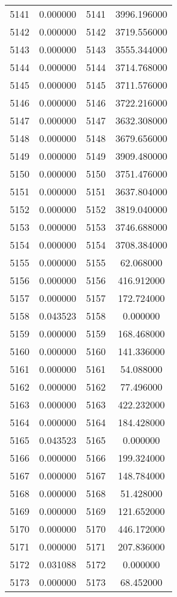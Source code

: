 \documentclass[12pt]{article}
\begin{document}
\begin{longtable}{@{}cccc@{}}
5141 & 0.000000 & 5141 & 3996.196000 \\
5142 & 0.000000 & 5142 & 3719.556000 \\
5143 & 0.000000 & 5143 & 3555.344000 \\
5144 & 0.000000 & 5144 & 3714.768000 \\
5145 & 0.000000 & 5145 & 3711.576000 \\
5146 & 0.000000 & 5146 & 3722.216000 \\
5147 & 0.000000 & 5147 & 3632.308000 \\
5148 & 0.000000 & 5148 & 3679.656000 \\
5149 & 0.000000 & 5149 & 3909.480000 \\
5150 & 0.000000 & 5150 & 3751.476000 \\
5151 & 0.000000 & 5151 & 3637.804000 \\
5152 & 0.000000 & 5152 & 3819.040000 \\
5153 & 0.000000 & 5153 & 3746.688000 \\
5154 & 0.000000 & 5154 & 3708.384000 \\
5155 & 0.000000 & 5155 & 62.068000 \\
5156 & 0.000000 & 5156 & 416.912000 \\
5157 & 0.000000 & 5157 & 172.724000 \\
5158 & 0.043523 & 5158 & 0.000000 \\
5159 & 0.000000 & 5159 & 168.468000 \\
5160 & 0.000000 & 5160 & 141.336000 \\
5161 & 0.000000 & 5161 & 54.088000 \\
5162 & 0.000000 & 5162 & 77.496000 \\
5163 & 0.000000 & 5163 & 422.232000 \\
5164 & 0.000000 & 5164 & 184.428000 \\
5165 & 0.043523 & 5165 & 0.000000 \\
5166 & 0.000000 & 5166 & 199.324000 \\
5167 & 0.000000 & 5167 & 148.784000 \\
5168 & 0.000000 & 5168 & 51.428000 \\
5169 & 0.000000 & 5169 & 121.652000 \\
5170 & 0.000000 & 5170 & 446.172000 \\
5171 & 0.000000 & 5171 & 207.836000 \\
5172 & 0.031088 & 5172 & 0.000000 \\
5173 & 0.000000 & 5173 & 68.452000 \\

\end{longtable}
\end{document}

